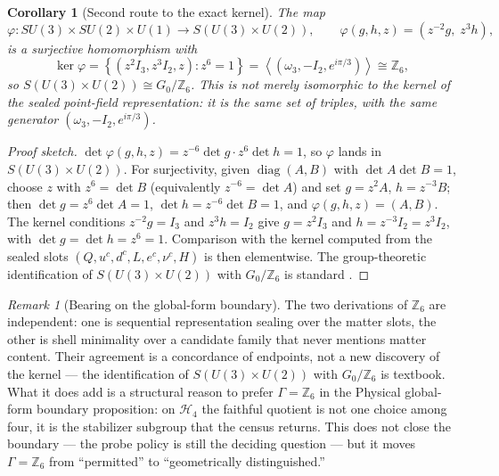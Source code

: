 \documentclass[11pt]{article}
\theoremstyle{plain}
\newtheorem{corollary}[theorem]{Corollary}
\theoremstyle{definition}
\theoremstyle{remark}
\newtheorem{remark}[theorem]{Remark}
\newenvironment{proofsketch}{\begin{proof}[Proof sketch]}{\end{proof}}
\begin{document}
\begin{corollary}[Second route to the exact kernel]
The map
\[
\varphi:SU(3)\times SU(2)\times U(1)\longrightarrow S(U(3)\times U(2)),
\qquad
\varphi(g,h,z)=(z^{-2}g,\;z^{3}h),
\]
is a surjective homomorphism with
\[
\ker\varphi
=\left\{(z^2I_3,z^3I_2,z):z^6=1\right\}
=\left\langle(\omega_3,-I_2,e^{i\pi/3})\right\rangle
\cong\mathbb Z_6 ,
\]
so \(S(U(3)\times U(2))\cong G_0/\mathbb Z_6\). This is not merely isomorphic to the kernel of the sealed point-field representation: it is the \emph{same set of triples}, with the same generator \((\omega_3,-I_2,e^{i\pi/3})\).
\end{corollary}

\begin{proofsketch}
\(\det\varphi(g,h,z)=z^{-6}\det g\cdot z^{6}\det h=1\), so \(\varphi\) lands in \(S(U(3)\times U(2))\). For surjectivity, given \(\operatorname{diag}(A,B)\) with \(\det A\det B=1\), choose \(z\) with \(z^6=\det B\) (equivalently \(z^{-6}=\det A\)) and set \(g=z^2A\), \(h=z^{-3}B\); then \(\det g=z^6\det A=1\), \(\det h=z^{-6}\det B=1\), and \(\varphi(g,h,z)=(A,B)\). The kernel conditions \(z^{-2}g=I_3\) and \(z^3h=I_2\) give \(g=z^2I_3\) and \(h=z^{-3}I_2=z^3I_2\), with \(\det g=\det h=z^6=1\). Comparison with the kernel computed from the sealed slots \((Q,u^c,d^c,L,e^c,\nu^c,H)\) is then elementwise. The group-theoretic identification of \(S(U(3)\times U(2))\) with \(G_0/\mathbb Z_6\) is standard \cite{baez-huerta}.
\end{proofsketch}

\begin{remark}[Bearing on the global-form boundary]
The two derivations of \(\mathbb Z_6\) are independent: one is sequential representation sealing over the matter slots, the other is shell minimality over a candidate family that never mentions matter content. Their agreement is a concordance of endpoints, not a new discovery of the kernel --- the identification of \(S(U(3)\times U(2))\) with \(G_0/\mathbb Z_6\) is textbook. What it does add is a structural reason to prefer \(\Gamma=\mathbb Z_6\) in the Physical global-form boundary proposition: on \(\mathcal H_4\) the faithful quotient is not one choice among four, it is the stabilizer subgroup that the census returns. This does not close the boundary --- the probe policy is still the deciding question --- but it moves \(\Gamma=\mathbb Z_6\) from ``permitted'' to ``geometrically distinguished.''
\end{remark}
\end{document}

